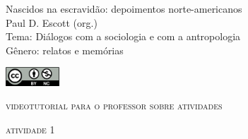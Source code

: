 \documentclass[smaller,professionalfonts,15pt]{beamer}
\begin{document}
										\begin{frame}\begin{raggedleft}
										\Huge 
Nascidos na escravidão: depoimentos norte-americanos
						\\
										\huge 
Paul D. Escott (org.)							\\
										\bigskip
										\normalsize
Tema: Diálogos com a sociologia e com a antropologia		\\	
Gênero: relatos e memórias		\\\vfill\hfill
\publishername

										\end{raggedleft}

\smallskip\includegraphics[width=2cm]{ccbync.png}\hfill
\end{frame}


\begin{frame}{\textsc{videotutorial para o professor sobre atividades}}
\vspace{-2cm}\begin{figure}
\end{figure}
\end{frame}


\begin{frame}
\hfill\Huge
\textsc{atividade 1}
\end{frame}
\end{document}
